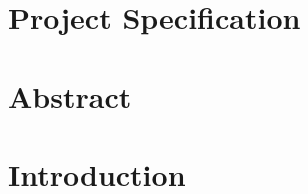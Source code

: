 \documentclass[12pt, letterpaper]{article}            %
\newcommand{\footrulecolor}[1]{\patchcmd{\footrule}{\hrule}{\color{#1}\hrule}{}{}} %
\begin{document}
\section*{Project Specification}
\lipsum[1]
\newpage

\section*{Abstract}
\lipsum[1]
\newpage

\tableofcontents
\newpage

\fancyfoot{} %
\renewcommand{\footrulewidth}{0.4pt} %
\footrulecolor{linec}

\section{Introduction}
\lipsum[1-10]
\end{document}
